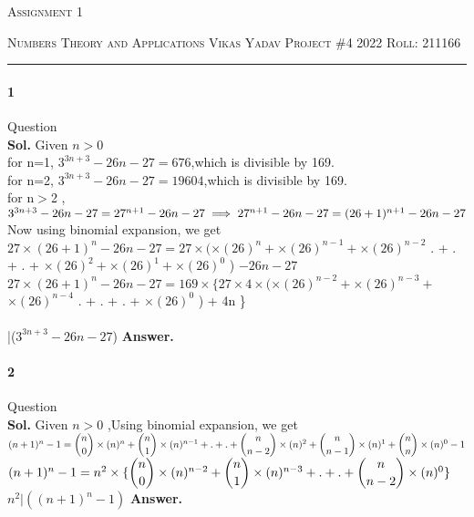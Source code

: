 \documentclass[12pt]{amsart}
\begin{document}
\thispagestyle{empty}
\begin{center}
    {\scshape \large  Assignment 1}
\end{center}
{\scshape Numbers Theory and Applications} \hfill 
\hfill {\scshape Vikas Yadav}
\linebreak
{\scshape Project \#4 2022}  \hfill {\scshape Roll: 211166}
\smallskip
\hrule
\bigskip

\paragraph*{1} Question
\bigskip \\
\textbf{Sol.}
Given $n>0$ \\for n=1, $3^{3n+3} - 26n -27=   676  $,which is divisible by 169. \\
for n=2, $ 3^{3n+3}  - 26n -27=   19604 $,which is divisible by 169.\\
for n$>$2 , $
             3^{3n+3} - 26n -27 = 27^{n + 1}-26n -27\\
             \implies 27^{n + 1}-26n -27= (26 + 1)^{n+ 1}- 26n- 27
            $ 
           \\ Now using binomial expansion, we get\\
            $
            27\times(26 + 1)^{n}- 26n- 27=
            27\times
            ($$\times(26)^{n} + $$\times(26)^{n-1} + $$\times(26)^{n-2}
            $ . + . + . + 
            $
           $$\times(26)^{2} + 
            $$\times(26)^{1}  + $$\times(26)^{0} 
            $ ) 
            $- 26n - 27$\\
            \implies $
            27\times(26+ 1)^{n}- 26n-27 = 169\times
           \{   27\times4\times   ($$\times(26)^{n-2} + $$\times(26)^{n-3} + $$\times(26)^{n-4}
            $ . + . + . + 
            $
           $$\times(26)^{0} 
            $ ) + 4n \}
            $
            $
            \\
            \\
            |($3^{3n+3} - 26n -27$) \textbf {Answer.}



\paragraph*{2} Question\\
\bigskip
\textbf{Sol.} Given $n>0$ ,Using binomial expansion, we get\\
$(n+ 1)^{n}- 1= \dbinom{n}{0}\times(n)^{n} + 
\dbinom{n}{1}\times(n)^{n-1} + . + . + \dbinom{n}{n-2}\times(n)^{2} + \dbinom{n}{n-1}\times(n)^{1} + 
\dbinom{n}{n}\times(n)^{0} - 1
$ \\
\implies $
(n+ 1)^{n}- 1= n^{2}\times\{\dbinom{n}{0}\times(n)^{n-2} + 
\dbinom{n}{1}\times(n)^{n-3} + . + . + \dbinom{n}{n-2}\times(n)^{0}\}
$\\
 \implies $ n^{2}|((n+1)^{n} - 1) $\textbf { Answer.}
\end{document}
